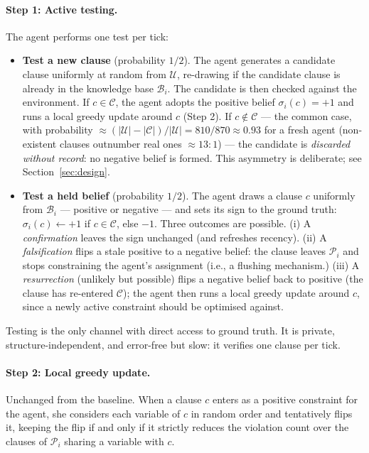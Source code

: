 \documentclass{article}
\begin{document}
\paragraph{Step 1: Active testing.} The agent performs one test per tick:
\begin{itemize}
  \item \textbf{Test a new clause} (probability $1/2$). The agent generates a candidate clause uniformly at random from $\mathcal{U}$, re-drawing if the candidate clause is already in the knowledge base $\mathcal{B}_i$. The candidate is then checked against the environment. If $c \in \mathcal{C}$, the agent adopts the positive belief $\sigma_i(c) = +1$ and runs a local greedy update around $c$ (Step 2). If $c \notin \mathcal{C}$ --- the common case, with probability $\approx (|\mathcal{U}| - |\mathcal{C}|)/|\mathcal{U}| = 810/870 \approx 0.93$ for a fresh agent (non-existent clauses outnumber real ones $\approx 13{:}1$) --- the candidate is \emph{discarded without record}: no negative belief is formed. This asymmetry is deliberate; see Section~\ref{sec:design}.
  \item \textbf{Test a held belief} (probability $1/2$). The agent draws a clause $c$ uniformly from $\mathcal{B}_i$ --- positive or negative --- and sets its sign to the ground truth: $\sigma_i(c) \leftarrow +1$ if $c \in \mathcal{C}$, else $-1$. Three outcomes are possible. (i) A \emph{confirmation} leaves the sign unchanged (and refreshes recency). (ii) A \emph{falsification} flips a stale positive to a negative belief: the clause leaves $\mathcal{P}_i$ and stops constraining the agent's assignment (i.e., a flushing mechanism.) (iii) A \emph{resurrection} (unlikely but possible) flips a negative belief back to positive (the clause has re-entered $\mathcal{C}$); the agent then runs a local greedy update around $c$, since a newly active constraint should be optimised against.
\end{itemize}
Testing is the only channel with direct access to ground truth. It is private, structure-independent, and error-free but slow: it verifies one clause per tick.

\paragraph{Step 2: Local greedy update.} Unchanged from the baseline. When a clause $c$ enters as a positive constraint for the agent, she considers each variable of $c$ in random order and tentatively flips it, keeping the flip if and only if it strictly reduces the violation count over the clauses of $\mathcal{P}_i$ sharing a variable with $c$.
\end{document}
